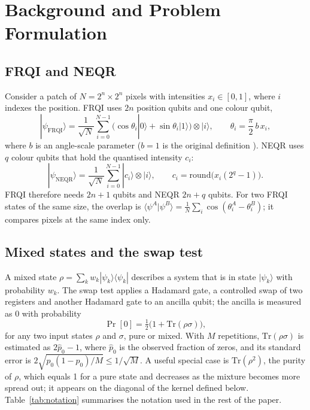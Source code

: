 \documentclass[12pt,onecolumn,draftclsnofoot]{IEEEtran}
\begin{document}
\section{Background and Problem Formulation}
\subsection{FRQI and NEQR}
Consider a patch of $N=2^n\times2^n$ pixels with intensities $x_i\in[0,1]$, where $i$ indexes the position. FRQI uses $2n$ position qubits and one colour qubit,
\begin{equation}
|\psi_{\mathrm{FRQI}}\rangle=\frac{1}{\sqrt N}\sum_{i=0}^{N-1}\big(\cos\theta_i|0\rangle+\sin\theta_i|1\rangle\big)\otimes|i\rangle,\qquad \theta_i=\frac{\pi}{2}\,b\,x_i,
\label{eq:frqi}
\end{equation}
where $b$ is an angle-scale parameter ($b=1$ is the original definition \cite{le2011frqi}). NEQR \cite{zhang2013neqr} uses $q$ colour qubits that hold the quantised intensity $c_i$:
\begin{equation}
|\psi_{\mathrm{NEQR}}\rangle=\frac{1}{\sqrt N}\sum_{i=0}^{N-1}|c_i\rangle\otimes|i\rangle,\qquad c_i=\mathrm{round}\big(x_i(2^q-1)\big).
\label{eq:neqr}
\end{equation}
FRQI therefore needs $2n+1$ qubits and NEQR $2n+q$ qubits. For two FRQI states of the same size, the overlap is $\langle\psi^A|\psi^B\rangle=\frac1N\sum_i\cos(\theta^A_i-\theta^B_i)$; it compares pixels at the same index only.

\subsection{Mixed states and the swap test}
A mixed state $\rho=\sum_k w_k|\psi_k\rangle\langle\psi_k|$ describes a system that is in state $|\psi_k\rangle$ with probability $w_k$. The swap test \cite{buhrman2001} applies a Hadamard gate, a controlled swap of two registers and another Hadamard gate to an ancilla qubit; the ancilla is measured as 0 with probability
\begin{equation}
\Pr[0]=\tfrac12\big(1+\mathrm{Tr}(\rho\sigma)\big),
\label{eq:swap}
\end{equation}
for any two input states $\rho$ and $\sigma$, pure or mixed. With $M$ repetitions, $\mathrm{Tr}(\rho\sigma)$ is estimated as $2\hat p_0-1$, where $\hat p_0$ is the observed fraction of zeros, and its standard error is $2\sqrt{p_0(1-p_0)/M}\le1/\sqrt M$. A useful special case is $\mathrm{Tr}(\rho^2)$, the purity of $\rho$, which equals 1 for a pure state and decreases as the mixture becomes more spread out; it appears on the diagonal of the kernel defined below. Table~\ref{tab:notation} summarises the notation used in the rest of the paper.
\end{document}
